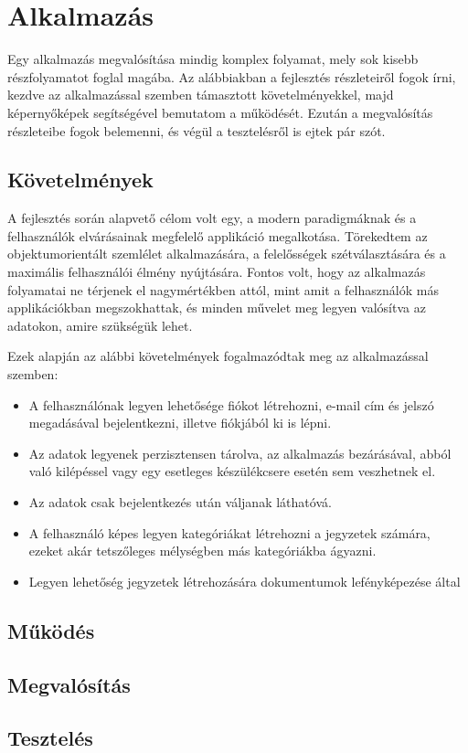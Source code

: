 \chapter{Alkalmazás}

Egy alkalmazás megvalósítása mindig komplex folyamat, mely sok kisebb részfolyamatot foglal magába. Az alábbiakban a fejlesztés részleteiről fogok írni, kezdve az alkalmazással szemben támasztott követelményekkel, majd képernyőképek segítségével bemutatom a működését. Ezután a megvalósítás részleteibe fogok belemenni, és végül a tesztelésről is ejtek pár szót.

\section{Követelmények}

A fejlesztés során alapvető célom volt egy, a modern paradigmáknak és a felhasználók elvárásainak megfelelő applikáció megalkotása. Törekedtem az objektumorientált szemlélet alkalmazására, a felelősségek szétválasztására és a maximális felhasználói élmény nyújtására. Fontos volt, hogy az alkalmazás folyamatai ne térjenek el nagymértékben attól, mint amit a felhasználók más applikációkban megszokhattak, és minden művelet meg legyen valósítva az adatokon, amire szükségük lehet. 

Ezek alapján az alábbi követelmények fogalmazódtak meg az alkalmazással szemben:
\begin{itemize}
	\item A felhasználónak legyen lehetősége fiókot létrehozni, e-mail cím és jelszó megadásával bejelentkezni, illetve fiókjából ki is lépni.
	\item Az adatok legyenek perzisztensen tárolva, az alkalmazás bezárásával, abból való kilépéssel vagy egy esetleges készülékcsere esetén sem veszhetnek el.
	\item Az adatok csak bejelentkezés után váljanak láthatóvá.
	\item A felhasználó képes legyen kategóriákat létrehozni a jegyzetek számára, ezeket akár tetszőleges mélységben más kategóriákba ágyazni.
	\item Legyen lehetőség jegyzetek létrehozására dokumentumok lefényképezése által
\end{itemize}

\section{Működés}

\section{Megvalósítás}

\section{Tesztelés}